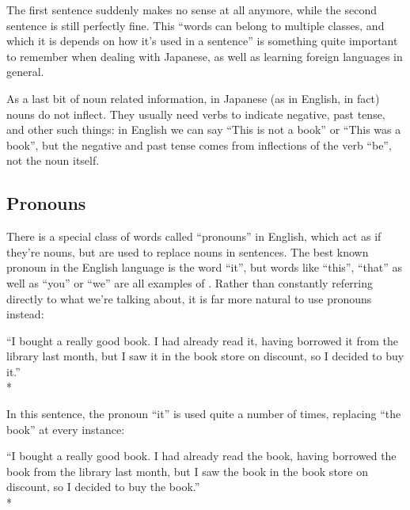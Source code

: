 \documentclass[11pt, b5paper, twoside, openright, onecolumn]{book}
\newenvironment{exampleblock}{
\setlength{\parindent}{0.6in}
\begin{minipage}[t]{\dimexpr\textwidth-\parindent}}
{\end{minipage}}
\begin{document}
The first sentence suddenly makes no sense at all anymore‚ while the second sentence is still perfectly fine. This “words can belong to multiple classes‚ and which it is depends on how it’s used in a sentence” is something quite important to remember when dealing with Japanese‚ as well as learning foreign languages in general.

As a last bit of noun related information‚ in Japanese (as in English‚ in fact) nouns do not inflect. They usually need verbs to indicate negative‚ past tense‚ and other such things: in English we can say “This is not a book” or “This was a book”‚ but the negative and past tense comes from inflections of the verb “be”‚ not the noun itself.

\subsection{Pronouns}

There is a special class of words called “pronouns” in English‚ which act as if they’re nouns‚ but are used to replace nouns in sentences. The best known pronoun in the English language is the word “it”‚ but words like “this”‚ “that” as well as “you” or “we” are all examples of . Rather than constantly referring directly to what we’re talking about‚ it is far more natural to use pronouns instead:

\vspace{0.4cm}
\begin{exampleblock}
“I bought a really good book. I had already read it‚ having borrowed it from the library last month‚ but I saw it in the book store on discount‚ so I decided to buy it.” \\* 
\end{exampleblock}
\vspace{0.2cm}

In this sentence‚ the pronoun “it” is used quite a number of times‚ replacing “the book” at every instance:

\vspace{0.4cm}
\begin{exampleblock}
“I bought a really good book. I had already read the book‚ having borrowed the book from the library last month‚ but I saw the book in the book store on discount‚ so I decided to buy the book.” \\* 
\end{exampleblock}
\vspace{0.2cm}
\end{document}
